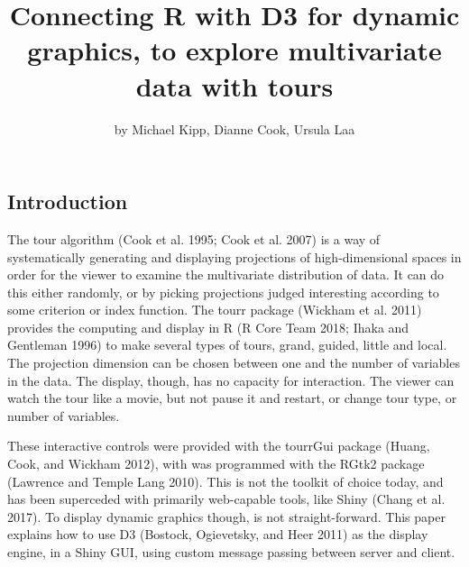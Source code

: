 \title{Connecting R with D3 for dynamic graphics, to explore multivariate data
with tours}
\author{by Michael Kipp, Dianne Cook, Ursula Laa}

\maketitle


\subsection{Introduction}\label{introduction}

The tour algorithm (Cook et al. 1995; Cook et al. 2007) is a way of
systematically generating and displaying projections of high-dimensional
spaces in order for the viewer to examine the multivariate distribution
of data. It can do this either randomly, or by picking projections
judged interesting according to some criterion or index function. The
tourr package (Wickham et al. 2011) provides the computing and display
in R (R Core Team 2018; Ihaka and Gentleman 1996) to make several types
of tours, grand, guided, little and local. The projection dimension can
be chosen between one and the number of variables in the data. The
display, though, has no capacity for interaction. The viewer can watch
the tour like a movie, but not pause it and restart, or change tour
type, or number of variables.

These interactive controls were provided with the tourrGui package
(Huang, Cook, and Wickham 2012), with was programmed with the RGtk2
package (Lawrence and {Temple Lang} 2010). This is not the toolkit of
choice today, and has been superceded with primarily web-capable tools,
like Shiny (Chang et al. 2017). To display dynamic graphics though, is
not straight-forward. This paper explains how to use D3 (Bostock,
Ogievetsky, and Heer 2011) as the display engine, in a Shiny GUI, using
custom message passing between server and client.

